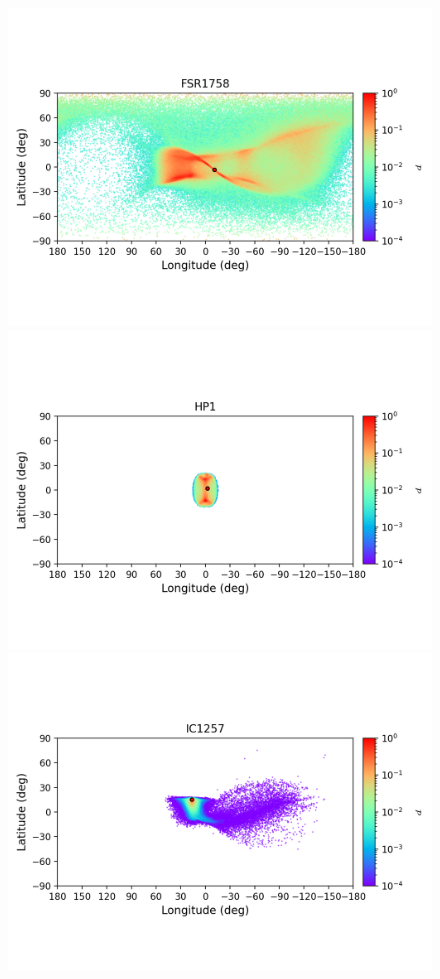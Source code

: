         \begin{figure}
        \includegraphics[clip=true, trim = 0mm 20mm 0mm 10mm, width=1\columnwidth]{images/error_plots_FSR1758.png}
        \includegraphics[clip=true, trim = 0mm 20mm 0mm 10mm, width=1\columnwidth]{images/error_plots_HP1.png}
        \includegraphics[clip=true, trim = 0mm 20mm 0mm 10mm, width=1\columnwidth]{images/error_plots_IC1257.png}

\end{figure}
